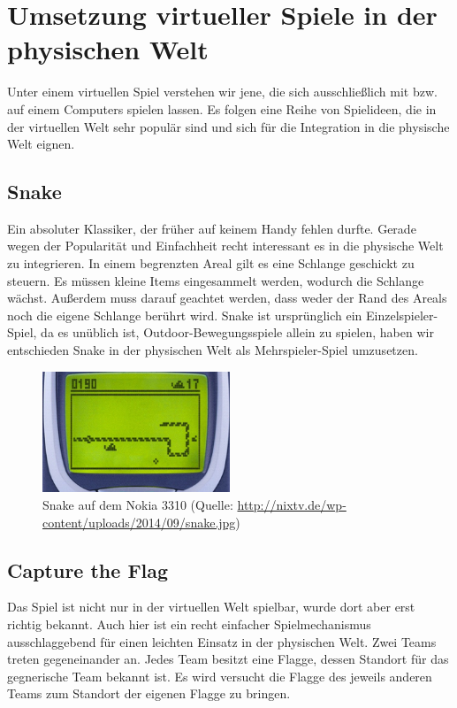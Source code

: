 \section{Umsetzung virtueller Spiele in der physischen Welt}

Unter einem virtuellen Spiel verstehen wir jene, die sich ausschließlich mit bzw. auf einem Computers spielen lassen. \newline
Es folgen eine Reihe von Spielideen, die in der virtuellen Welt sehr populär sind und sich für die Integration in die physische Welt eignen.
\subsection*{Snake}
Ein absoluter Klassiker, der früher auf keinem Handy fehlen durfte. Gerade wegen der
Popularität und Einfachheit recht interessant es in die physische Welt zu integrieren.
In einem begrenzten Areal gilt es eine Schlange geschickt zu steuern. Es müssen kleine
Items eingesammelt werden, wodurch die Schlange wächst. Außerdem muss darauf
geachtet werden, dass weder der Rand des Areals noch die eigene Schlange berührt wird.
\newline
Snake ist ursprünglich ein Einzelspieler-Spiel, da es unüblich ist, Outdoor-Bewegungsspiele allein zu spielen, haben wir entschieden Snake in der physischen Welt als Mehrspieler-Spiel umzusetzen.

\begin{figure}[htbp]
  \centering
    \includegraphics[width=0.5\textwidth]{2-Spielideen/2-1-Umsetzung_virtueller_Spiele_in_der_physischen_Welt/snake.png}
     \caption{Snake auf dem Nokia 3310 
		(Quelle: \url{http://nixtv.de/wp-content/uploads/2014/09/snake.jpg}) }
\end{figure}

\subsection*{Capture the Flag}
Das Spiel ist nicht nur in der virtuellen Welt spielbar, wurde dort aber erst richtig bekannt.
Auch hier ist ein recht einfacher Spielmechanismus ausschlaggebend für einen leichten
Einsatz in der physischen Welt.
Zwei Teams treten gegeneinander an. Jedes Team besitzt eine Flagge, dessen Standort für
das gegnerische Team bekannt ist. Es wird versucht die Flagge des jeweils anderen Teams
zum Standort der eigenen Flagge zu bringen.
